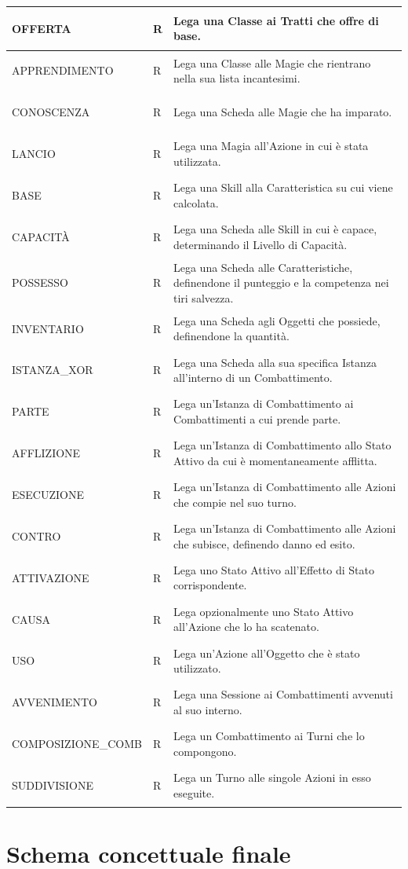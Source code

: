 \documentclass[a4paper,12pt]{report}
\begin{document}
\begin{longtable}{@{} >{\bfseries\raggedright\arraybackslash}p{} >{\centering\arraybackslash}p{} >{\raggedright\arraybackslash}p{} @{}}
    OFFERTA & R & Lega una Classe ai Tratti che offre di base. \\ \midrule 
    APPRENDIMENTO & R & Lega una Classe alle Magie che rientrano nella sua lista incantesimi. \\ \midrule 
    CONOSCENZA & R & Lega una Scheda alle Magie che ha imparato. \\ \midrule 
    LANCIO & R & Lega una Magia all'Azione in cui è stata utilizzata. \\ \midrule 
    BASE & R & Lega una Skill alla Caratteristica su cui viene calcolata. \\ \midrule 
    CAPACITÀ & R & Lega una Scheda alle Skill in cui è capace, determinando il Livello di Capacità. \\ \midrule 
    POSSESSO & R & Lega una Scheda alle Caratteristiche, definendone il punteggio e la competenza nei tiri salvezza. \\ \midrule 
    INVENTARIO & R & Lega una Scheda agli Oggetti che possiede, definendone la quantità. \\ \midrule 
    ISTANZA\_XOR & R & Lega una Scheda alla sua specifica Istanza all'interno di un Combattimento. \\ \midrule 
    PARTE & R & Lega un'Istanza di Combattimento ai Combattimenti a cui prende parte. \\ \midrule
    AFFLIZIONE & R & Lega un'Istanza di Combattimento allo Stato Attivo da cui è momentaneamente afflitta. \\ \midrule 
    ESECUZIONE & R & Lega un'Istanza di Combattimento alle Azioni che compie nel suo turno. \\ \midrule 
    CONTRO & R & Lega un'Istanza di Combattimento alle Azioni che subisce, definendo danno ed esito. \\ \midrule 
    ATTIVAZIONE & R & Lega uno Stato Attivo all'Effetto di Stato corrispondente. \\ \midrule 
    CAUSA & R & Lega opzionalmente uno Stato Attivo all'Azione che lo ha scatenato. \\ \midrule 
    USO & R & Lega un'Azione all'Oggetto che è stato utilizzato. \\ \midrule 
    AVVENIMENTO & R & Lega una Sessione ai Combattimenti avvenuti al suo interno. \\ \midrule 
    COMPOSIZIONE\_COMB & R & Lega un Combattimento ai Turni che lo compongono. \\ \midrule 
    SUDDIVISIONE & R & Lega un Turno alle singole Azioni in esso eseguite. \\ \midrule

\end{longtable}\section{Schema concettuale finale}
\end{document}
